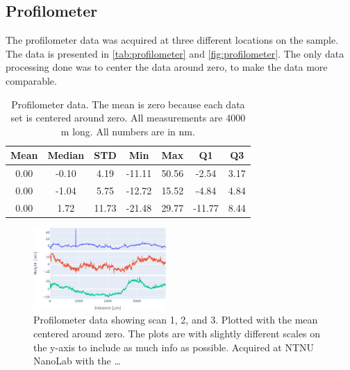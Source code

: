 
\subsection{Profilometer}
\label{results:profilometer}

The profilometer data was acquired at three different locations on the sample.
The data is presented in \autoref{tab:profilometer} and \autoref{fig:profilometer}.
The only data processing done was to center the data around zero, to make the data more comparable.

\begin{table}[ht]
    \centering
    \caption{
        Profilometer data.
        The mean is zero because each data set is centered around zero.
        All measurements are 4000 \textmu m long.
        All numbers are in nm.
    }
    \begin{tabular}{ccccccc}
        Mean & Median & STD   & Min    & Max   & Q1     & Q3   \\
        \hline
        0.00 & -0.10  & 4.19  & -11.11 & 50.56 & -2.54  & 3.17 \\
        0.00 & -1.04  & 5.75  & -12.72 & 15.52 & -4.84  & 4.84 \\
        0.00 & 1.72   & 11.73 & -21.48 & 29.77 & -11.77 & 8.44 \\
    \end{tabular}
    \label{tab:profilometer}
\end{table}



\begin{figure}[ht]
    \centering
    \includegraphics[width=0.45\textwidth]{figures/profilometer_graph.jpg}
    \caption{Profilometer data showing scan 1, 2, and 3.
        Plotted with the mean centered around zero.
        The plots are with slightly different scales on the y-axis to include as much info as possible.
        Acquired at NTNU NanoLab with the \dots}
    \label{fig:profilometer}
\end{figure}



